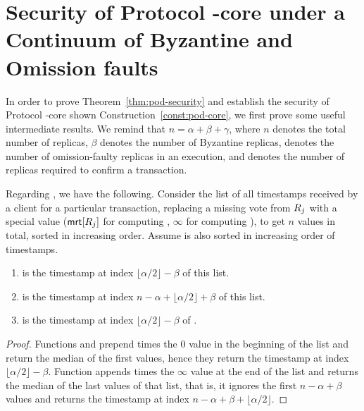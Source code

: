 \section{Security of Protocol \podtm-core under a Continuum of Byzantine and Omission faults}\label{app:pod-security}
In order to prove Theorem~\ref{thm:pod-security} and establish the security of Protocol \podtm-core shown Construction~\ref{const:pod-core}, we first prove some useful intermediate results. We remind that $n = \alpha + \beta + \gamma$, where $n$ denotes the total number of replicas, $\beta$ denotes the number of Byzantine replicas, \gamma denotes the number of omission-faulty replicas in an execution, and \alpha denotes the number of replicas required to confirm a transaction.

\begin{lemma}\label{lem:assign-min-max}
	Regarding , we have the following.
	Consider the list of all timestamps received by a client for a particular transaction, replacing a missing vote from $R_j$ with a special value ($\textsf{mrt}[R_j]$ for computing \rmin, $\infty$ for computing \rmax), to get $n$ values in total, sorted in increasing order.
	Assume \mrt is also sorted in increasing order of timestamps.
	\begin{enumerate}
		\item \rmin is the timestamp at index $\lfloor \alpha / 2 \rfloor - \beta$ of this list.
		\item \rmax is the timestamp at index $n - \alpha + \lfloor \alpha / 2 \rfloor + \beta$ of this list.
		\item \rperf is the timestamp at index $\lfloor \alpha / 2 \rfloor - \beta$ of \mrt.
	\end{enumerate}
\end{lemma}
\begin{proof}
	Functions \opMinPossibleTs{} and \opMinPossibleTsForNewTx{} prepend \beta times the $0$ value in the beginning of the list and return the median of the first \alpha values, hence they return the timestamp at index $\lfloor \alpha / 2 \rfloor - \beta$.
	Function \opMaxPossibleTs{} appends \beta times the $\infty$ value at the end of the list and returns the median of the last \alpha values of that list, that is, it ignores the first $n - \alpha  + \beta$ values and returns the timestamp at index $n - \alpha  + \beta + \lfloor \alpha / 2 \rfloor$.
\end{proof}

